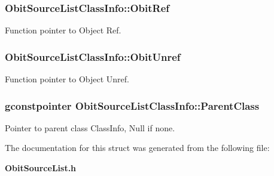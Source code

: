 \subsubsection{ {\bf Obit\-Source\-List\-Class\-Info::Obit\-Ref}}\label{structObitSourceListClassInfo_o10}


Function pointer to Object Ref. 

\subsubsection{ {\bf Obit\-Source\-List\-Class\-Info::Obit\-Unref}}\label{structObitSourceListClassInfo_o11}


Function pointer to Object Unref. 

\subsubsection{\setlength{\rightskip}{0pt plus 5cm}gconstpointer {\bf Obit\-Source\-List\-Class\-Info::Parent\-Class}}\label{structObitSourceListClassInfo_o3}


Pointer to parent class Class\-Info, Null if none. 



The documentation for this struct was generated from the following file:\begin{CompactItemize}
\item 
{\bf Obit\-Source\-List.h}\end{CompactItemize}
